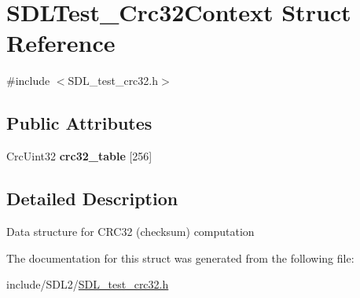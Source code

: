 \hypertarget{struct_s_d_l_test___crc32_context}{}\section{S\+D\+L\+Test\+\_\+\+Crc32\+Context Struct Reference}
\label{struct_s_d_l_test___crc32_context}


{\ttfamily \#include $<$S\+D\+L\+\_\+test\+\_\+crc32.\+h$>$}

\subsection*{Public Attributes}
\begin{DoxyCompactItemize}
\item 
\mbox{\label{struct_s_d_l_test___crc32_context_ae95d0d0b48bafc4e2f6f032f754ffa4c}} 
Crc\+Uint32 {\bfseries crc32\+\_\+table} \mbox{[}256\mbox{]}
\end{DoxyCompactItemize}


\subsection{Detailed Description}
Data structure for C\+R\+C32 (checksum) computation 

The documentation for this struct was generated from the following file\+:\begin{DoxyCompactItemize}
\item 
include/\+S\+D\+L2/\hyperlink{_s_d_l__test__crc32_8h}{S\+D\+L\+\_\+test\+\_\+crc32.\+h}\end{DoxyCompactItemize}
